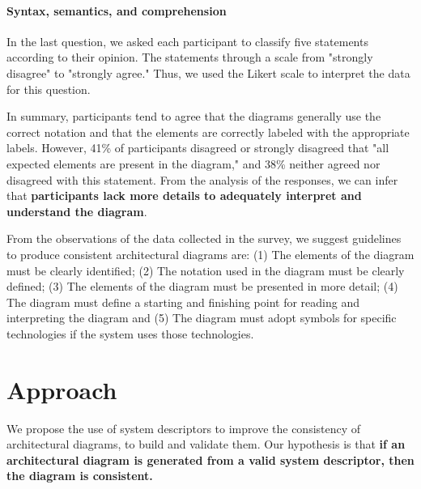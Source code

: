 \documentclass[sigconf]{acmart}
\begin{document}
\paragraph{Syntax, semantics, and comprehension}

In the last question, we asked each participant to classify five statements according to their opinion. The statements through a scale from "strongly disagree" to "strongly agree." Thus, we used the Likert scale to interpret the data for this question.

In summary, participants tend to agree that the diagrams generally use the correct notation and that the elements are correctly labeled with the appropriate labels. However, 41\% of participants disagreed or strongly disagreed that "all expected elements are present in the diagram," and 38\% neither agreed nor disagreed with this statement. From the analysis of the responses, we can infer that \textbf{participants lack more details to adequately interpret and understand the diagram}.

From the observations of the data collected in the survey, we suggest guidelines to produce consistent architectural diagrams are: (1) The elements of the diagram must be clearly identified; (2) The notation used in the diagram must be clearly defined; (3) The elements of the diagram must be presented in more detail; (4) The diagram must define a starting and finishing point for reading and interpreting the diagram and (5) The diagram must adopt symbols for specific technologies if the system uses those technologies.


\section{Approach}
\label{sec:approach}

We propose the use of system descriptors to improve the consistency of architectural diagrams, to build and validate them. Our hypothesis is that \textbf{if an architectural diagram is generated from a valid system descriptor, then the diagram is consistent.}
\end{document}
